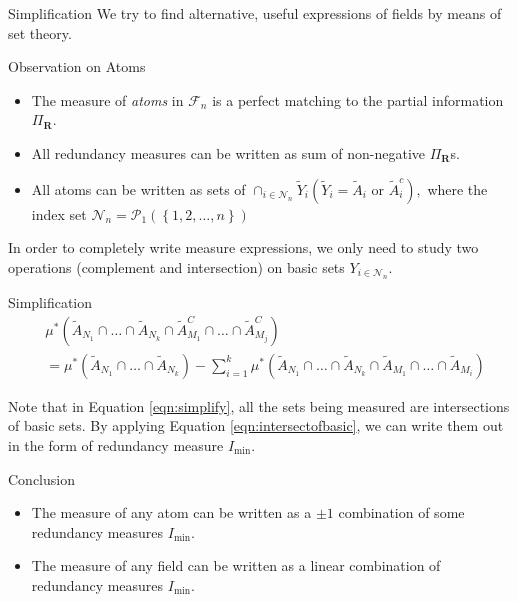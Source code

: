 \begin{frame}{Simplification}
    We try to find alternative, useful expressions of fields by means of set theory.
    \begin{block}{Observation on Atoms}
        \begin{itemize}
            \item  The measure of \textit{atoms} in $\mathcal{F}_n$ is a perfect matching to the partial information $\Pi_{\mathbf{R}}$.
            \item All redundancy measures can be written as sum of non-negative $\Pi_{\mathbf{R}}$s.
            \item All atoms can be written as sets of $\cap _{i\in\mathcal{N}_n} \tilde{Y}_i (\tilde{Y}_i = \tilde{A}_i \text{ or } \tilde{A}_i^c),$ where the index set $\mathcal{N}_n = \mathcal{P}_1\left(\left\{ 1,2,\ldots,n\right\}\right) $
        \end{itemize}
    \end{block}
    In order to completely write measure expressions, we only need to study two operations (complement and intersection) on basic sets $Y_{i \in \mathcal{N}_n}$.
\end{frame}

\begin{frame}{Simplification}
    \begin{align}
    & \mu^{*}\left( \tilde{A}_{N_1} \cap \ldots \cap \tilde{A}_{N_k} \cap \tilde{A}_{M_1}^{C} \cap \ldots\cap \tilde{A}_{M_j}^{C} \right) \\
    &= \mu^{*}\left(\tilde{A}_{N_1} \cap \ldots \cap \tilde{A}_{N_k} \right) - \sum_{i=1}^{k} \mu^{*} \left( \tilde{A}_{N_1} \cap \ldots \cap \tilde{A}_{N_k} \cap\tilde{A}_{M_1} \cap \ldots \cap \tilde{A}_{M_i} \right) \label{eqn:simplify}
    \end{align}

Note that in Equation \ref{eqn:simplify}, all the sets being measured are intersections of basic sets. By applying Equation \ref{eqn:intersectofbasic}, we can write them out in the form of redundancy measure $I_{\min}$.

\begin{block}{Conclusion}
\begin{itemize}
    \item The measure of any atom can be written as a $\pm 1$ combination of some redundancy measures $I_{\min}$.
    \item The measure of any field can be written as a linear combination of redundancy measures $I_{\min}$.
\end{itemize}
\end{block}
\end{frame}

